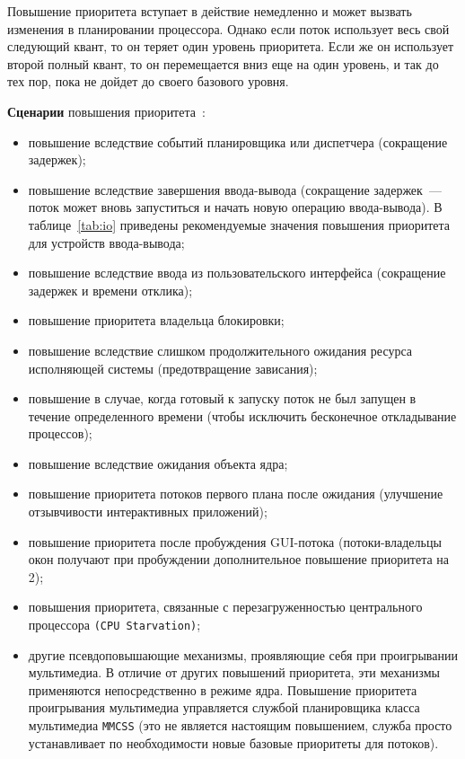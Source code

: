 Повышение приоритета вступает в действие немедленно и может вызвать изменения в планировании процессора. 
Однако если поток использует весь свой следующий квант, то он теряет один уровень приоритета. 
Если же он использует второй полный квант, то он перемещается вниз еще  на один уровень, и так до тех пор, пока не дойдет до своего базового уровня. 

\textbf{Сценарии} повышения приоритета~\cite{solrus}:
\begin{itemize}
	\item повышение вследствие событий планировщика или диспетчера (сокращение задержек);
	\item повышение вследствие завершения ввода-вывода (сокращение задержек~--- поток может вновь запуститься и начать новую операцию ввода-вывода). В таблице~\ref{tab:io} приведены рекомендуемые значения повышения приоритета для устройств ввода-вывода;
	\item повышение вследствие ввода из пользовательского интерфейса (сокращение задержек и времени отклика);
	\item повышение приоритета владельца блокировки;
	\item повышение вследствие слишком продолжительного ожидания ресурса исполняющей системы (предотвращение зависания);
	\item повышение в случае, когда готовый к запуску поток не был запущен в течение определенного времени (чтобы исключить бесконечное откладывание процессов);
	\item повышение вследствие ожидания объекта ядра;
	\item повышение приоритета потоков первого плана после ожидания (улучшение отзывчивости интерактивных приложений);
	\item повышение приоритета после пробуждения GUI-потока (потоки-владельцы окон получают при пробуждении дополнительное повышение приоритета на 2);
	\item повышения приоритета, связанные с перезагруженностью центрального процессора \texttt{(CPU Starvation)};
	\item другие псевдоповышающие механизмы, проявляющие себя при проигрывании мультимедиа. 
	В отличие от других повышений приоритета, эти механизмы применяются непосредственно в режиме ядра. 
	Повышение приоритета проигрывания мультимедиа управляется службой планировщика класса мультимедиа \texttt{MMCSS} (это не является настоящим повышением, служба просто устанавливает по необходимости новые базовые приоритеты для потоков).
\end{itemize}

